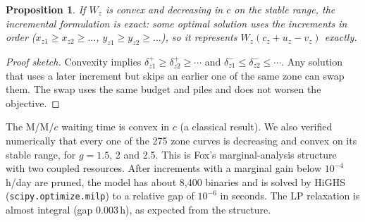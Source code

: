 \documentclass[11pt,a4paper]{article}
\newtheorem{proposition}{Proposition}
\begin{document}
\begin{proposition}\label{prop:exact}
If $W_z$ is convex and decreasing in $c$ on the stable range, the incremental formulation is exact: some optimal solution uses the increments in order ($x_{z1}\ge x_{z2}\ge\dots$, $y_{z1}\ge y_{z2}\ge\dots$), so it represents $W_z(c_z+u_z-v_z)$ exactly.
\end{proposition}
\begin{proof}[Proof sketch]
Convexity implies $\delta^+_{z1}\ge\delta^+_{z2}\ge\cdots$ and $\delta^-_{z1}\le\delta^-_{z2}\le\cdots$. Any solution that uses a later increment but skips an earlier one of the same zone can swap them. The swap uses the same budget and piles and does not worsen the objective.
\end{proof}
The M/M/$c$ waiting time is convex in $c$ (a classical result). We also verified numerically that every one of the 275 zone curves is decreasing and convex on its stable range, for $g = 1.5$, 2 and 2.5. This is Fox's marginal-analysis structure~\cite{fox1966} with two coupled resources. After increments with a marginal gain below $10^{-4}$\,h/day are pruned, the model has about 8{,}400 binaries and is solved by HiGHS (\texttt{scipy.optimize.milp}) to a relative gap of $10^{-6}$ in seconds. The LP relaxation is almost integral (gap 0.003\,h), as expected from the structure.
\end{document}
